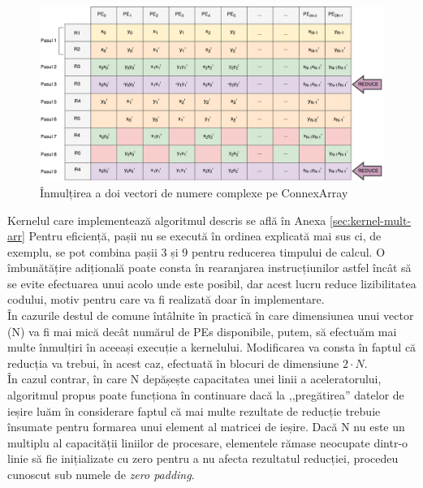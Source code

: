 \begin{figure}[H]
    \centering
    \includegraphics[width=1\textwidth]{src/img/complex-mult-arrow}
    \caption{Înmulțirea a doi vectori de numere complexe pe ConnexArray}
    \label{fig:complex-mult}
\end{figure}

Kernelul care implementează algoritmul descris se află în Anexa \ref{sec:kernel-mult-arr} Pentru
eficiență, pașii nu se execută în ordinea explicată mai sus ci, de exemplu, se
pot combina pașii 3 și 9 pentru reducerea timpului de calcul. O îmbunătățire
adițională poate consta în rearanjarea instrucțiunilor astfel încât să se evite
efectuarea unui  acolo unde este posibil, dar acest lucru reduce
lizibilitatea codului, motiv pentru care va fi realizată doar în implementare. \\

În cazurile destul de comune întâlnite în practică în care dimensiunea unui
vector (N) va fi mai mică decât numărul de PEs disponibile, putem, să efectuăm
mai multe înmulțiri în aceeași execuție a kernelului. Modificarea va consta în
faptul că reducția va trebui, în acest caz, efectuată în blocuri de dimensiune
$2 \cdot N$. \\

În cazul contrar, în care N depășește capacitatea unei linii a aceleratorului,
algoritmul propus poate funcționa în continuare dacă la ,,pregătirea'' datelor
de ieșire luăm în considerare faptul că mai multe rezultate de reducție trebuie
însumate pentru formarea unui element al matricei de ieșire. Dacă N nu este un
multiplu al capacității liniilor de procesare, elementele rămase neocupate
dintr-o linie să fie inițializate cu zero pentru a nu afecta rezultatul
reducției, procedeu cunoscut sub numele de \textit{zero padding}.

